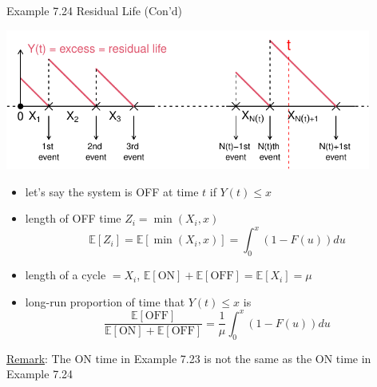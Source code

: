 \documentclass[letterpaper,handout, mathserif]{beamer}
\def\E{\mathbb E}
\begin{document}
\begin{frame}{Example 7.24 Residual Life (Con'd)}
\begin{center}
\includegraphics[width=0.9\textwidth, trim=0 45 0 0, clip]{L17_ResidualLife.pdf}
\end{center}
\begin{itemize}
\item let's say the system is OFF at time $t$ if $Y(t) \le x$
\item length of OFF time $Z_i= \min(X_i,x)$
$$\E[Z_i] = \E[\min(X_i,x)] =\int_0^x (1 - F(u))du$$
\item length of a cycle $= X_i$, $\E[\text{ON}] + \E[\text{OFF}] = \E[X_i] = \mu$
\item long-run proportion of time that $Y(t) \le x$ is
$$\frac{\E[\text{OFF}]}{\E[\text{ON}] + \E[\text{OFF}]}=\frac{1}{\mu}\int_0^x (1 - F(u))du$$
\end{itemize}
\underline{Remark}: The ON time in Example 7.23 is not the same as the
ON time in Example 7.24
\end{frame}
%
\end{document}
